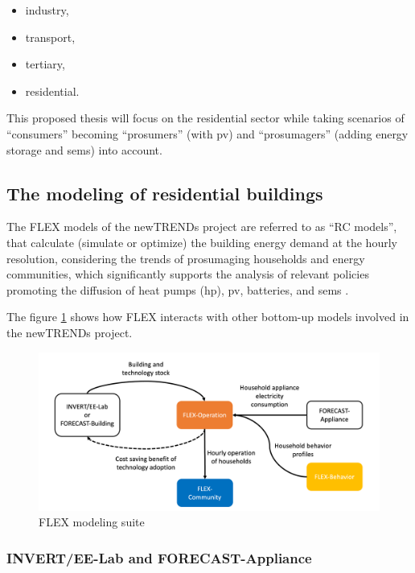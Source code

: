 \begin{itemize}
  \item industry, 
  \item transport,  
  \item tertiary, 
  \item residential.  
\end{itemize}

This proposed thesis will focus on the residential sector 
while taking scenarios of “consumers” becoming “prosumers” (with \gls{pv}) and “prosumagers” (adding energy storage and \gls{sems}) \cite{consumer} into account.  


\subsection{The modeling of residential buildings}


The FLEX models of the newTRENDs project are referred to as “RC models”,
that calculate (simulate or optimize) the building energy demand at the hourly resolution,
considering the trends of prosumaging households and energy communities, 
which significantly supports the analysis of relevant policies promoting the diffusion of heat pumps (\gls{hp}), \gls{pv}, batteries, and \gls{sems} \cite{newtrends}.


The figure \ref{fig:flex} shows how FLEX interacts with other bottom-up models involved in the newTRENDs project.

\begin{figure}[h]
  \centering
  \includegraphics[width=\textwidth]{Images/flex.png}
  \caption{FLEX modeling suite}
  \label{fig:flex}
\end{figure}


\subsubsection{INVERT/EE-Lab and FORECAST-Appliance}


